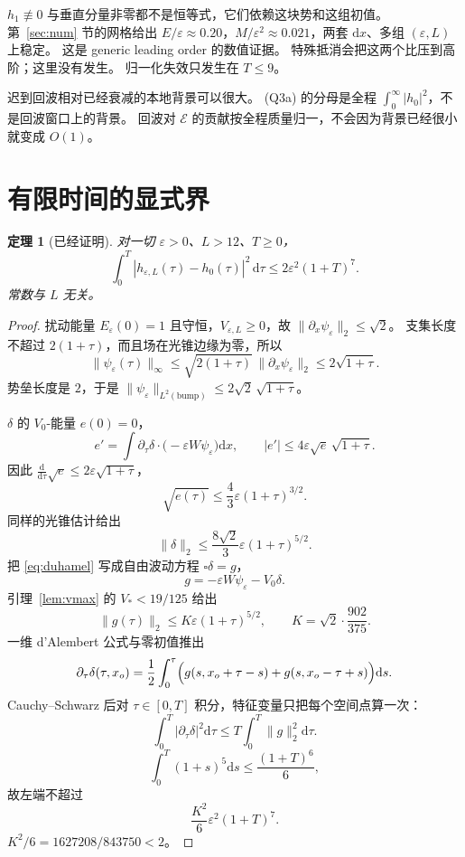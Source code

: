 \documentclass[11pt]{ctexart}
\newtheorem{theorem}{定理}
\theoremstyle{definition}
\theoremstyle{remark}
\newcommand{\eps}{\varepsilon}
\newcommand{\rd}{\mathrm{d}}
\newcommand{\cE}{\mathcal E}
\newcommand{\dx}{\mathrm{d}x}
\begin{document}
$h_1\not\equiv0$ 与垂直分量非零都不是恒等式，它们依赖这块势和这组初值。
第~\ref{sec:num} 节的网格给出 $E/\eps\approx0.20$，$M/\eps^2\approx0.021$，两套 $\dx$、多组 $(\eps,L)$ 上稳定。
这是 generic leading order 的数值证据。
特殊抵消会把这两个比压到高阶；这里没有发生。
归一化失效只发生在 $T\le9$。

迟到回波相对已经衰减的本地背景可以很大。
(Q3a) 的分母是全程 $\int_0^\infty|h_0|^2$，不是回波窗口上的背景。
回波对 $\cE$ 的贡献按全程质量归一，不会因为背景已经很小就变成 $O(1)$。

\section{有限时间的显式界}
\label{sec:bound}

\begin{theorem}[已经证明]
\label{thm:bound}
对一切 $\eps>0$、$L>12$、$T\ge0$，
\begin{equation}
\label{eq:bound}
\int_0^T|h_{\eps,L}(\tau)-h_0(\tau)|^2\,\rd\tau\le 2\eps^2(1+T)^7.
\end{equation}
常数与 $L$ 无关。
\end{theorem}

\begin{proof}
扰动能量 $E_\eps(0)=1$ 且守恒，$V_{\eps,L}\ge0$，故 $\|\partial_x\psi_{\eps}\|_2\le\sqrt2$。
支集长度不超过 $2(1+\tau)$，而且场在光锥边缘为零，所以
\[
\|\psi_{\eps}(\tau)\|_\infty\le\sqrt{2(1+\tau)}\,\|\partial_x\psi_{\eps}\|_2\le 2\sqrt{1+\tau}.
\]
势垒长度是 $2$，于是 $\|\psi_{\eps}\|_{L^2(\mathrm{bump})}\le 2\sqrt2\,\sqrt{1+\tau}$。

$\delta$ 的 $V_0$-能量 $e(0)=0$，
\[
e'=\int\partial_\tau\delta\cdot\bigl(-\eps W\psi_{\eps}\bigr)\rd x,
\qquad
|e'|\le 4\eps\sqrt{e}\,\sqrt{1+\tau}.
\]
因此 $\frac{\rd}{\rd\tau}\sqrt{e}\le 2\eps\sqrt{1+\tau}$，
\[
\sqrt{e(\tau)}\le\frac43\eps(1+\tau)^{3/2}.
\]
同样的光锥估计给出
\[
\|\delta\|_2\le\frac{8\sqrt2}{3}\eps(1+\tau)^{5/2}.
\]
把 \eqref{eq:duhamel} 写成自由波动方程 $\square\delta=g$，
\[
g=-\eps W\psi_{\eps}-V_0\delta.
\]
引理~\ref{lem:vmax} 的 $V_*<19/125$ 给出
\[
\|g(\tau)\|_2\le K\eps(1+\tau)^{5/2},
\qquad
K=\sqrt2\cdot\frac{902}{375}.
\]
一维 d'Alembert 公式与零初值推出
\[
\partial_\tau\delta(\tau,x_o)=\frac12\int_0^\tau\Bigl(g(s,x_o+\tau-s)+g(s,x_o-\tau+s)\Bigr)\rd s.
\]
Cauchy--Schwarz 后对 $\tau\in[0,T]$ 积分，特征变量只把每个空间点算一次：
\[
\int_0^T|\partial_\tau\delta|^2\rd\tau\le T\int_0^T\|g\|_2^2\rd\tau.
\]
\[
\int_0^T(1+s)^5\rd s\le\frac{(1+T)^6}{6},
\]
故左端不超过
\[
\frac{K^2}{6}\eps^2(1+T)^7.
\]
$K^2/6=1627208/843750<2$。
\end{proof}
\end{document}
